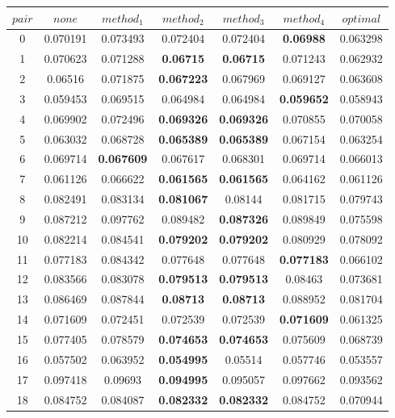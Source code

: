 \begin{table}[t]
\small
    \centering
    \begin{tabular}{c|c|c|c|c|c|c}
         $pair$ & $none$ & $method_1$ &  $method_2$ & $method_3$ & $method_4$ & $optimal$ \\
         \hline
0  & 0.070191 & 0.073493 & 0.072404 & 0.072404 & \textbf{0.06988} & 0.063298 \\
1  & 0.070623 & 0.071288 & \textbf{0.06715} & \textbf{0.06715} & 0.071243 & 0.062932 \\
2  & 0.06516 & 0.071875 & \textbf{0.067223} & 0.067969 & 0.069127 & 0.063608 \\
3  & 0.059453 & 0.069515 & 0.064984 & 0.064984 & \textbf{0.059652} & 0.058943 \\
4  & 0.069902 & 0.072496 & \textbf{0.069326} & \textbf{0.069326} & 0.070855 & 0.070058 \\
5  & 0.063032 & 0.068728 & \textbf{0.065389} & \textbf{0.065389} & 0.067154 & 0.063254 \\
6  & 0.069714 & \textbf{0.067609} & 0.067617 & 0.068301 & 0.069714 & 0.066013\\
7  & 0.061126 & 0.066622 & \textbf{0.061565} & \textbf{0.061565} & 0.064162 & 0.061126 \\
8  & 0.082491 & 0.083134 & \textbf{0.081067} &  0.08144 & 0.081715 & 0.079743 \\
9  & 0.087212 & 0.097762 & 0.089482 & \textbf{0.087326} & 0.089849 & 0.075598 \\
10  & 0.082214 & 0.084541 & \textbf{0.079202} & \textbf{0.079202}  & 0.080929 & 0.078092 \\
11  & 0.077183 & 0.084342 & 0.077648 & 0.077648 & \textbf{0.077183} & 0.066102 \\
12  &  0.083566 & 0.083078 & \textbf{0.079513} & \textbf{0.079513} & 0.08463 & 0.073681 \\
13  & 0.086469 & 0.087844 & \textbf{0.08713} & \textbf{0.08713} & 0.088952 & 0.081704 \\
14  & 0.071609 & 0.072451 & 0.072539 & 0.072539 & \textbf{0.071609} & 0.061325 \\
15  &  0.077405 & 0.078579 & \textbf{0.074653} & \textbf{0.074653} & 0.075609 & 0.068739 \\
16  & 0.057502 & 0.063952 & \textbf{0.054995} & 0.05514 & 0.057746 & 0.053557 \\
17  & 0.097418 & 0.09693 & \textbf{0.094995} & 0.095057 & 0.097662 & 0.093562 \\
18  & 0.084752 & 0.084087 & \textbf{0.082332} & \textbf{0.082332} & 0.084752 & 0.070944 \\

\end{tabular}
\end{table}
